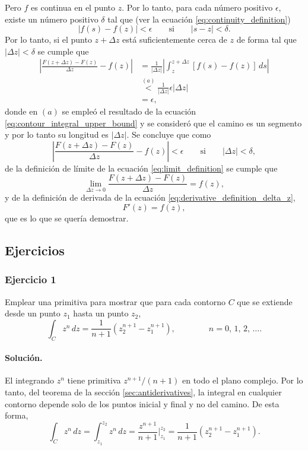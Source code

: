\documentclass[a4paper]{report}
\begin{document}
Pero \(f\) es continua en el punto \(z\). Por lo tanto, para cada número positivo \(\epsilon\), existe un número positivo \(\delta\) tal que (ver la ecuación \ref{eq:continuity_definition})
\[
 |f(s)-f(z)|<\epsilon\qquad\textrm{si}\qquad|s-z|<\delta. 
\]
Por lo tanto, si el punto \(z+\Delta z\) está suficientemente cerca de \(z\) de forma tal que \(|\Delta z|<\delta\) se cumple que
\begin{align*}
 \left|\frac{F(z+\Delta z)-F(z)}{\Delta z}-f(z)\right|&=\frac{1}{|\Delta z|}\left|\int_{z}^{z+\Delta z}[f(s)-f(z)]\,ds\right|\\ 
 &\overset{(a)}{<}\frac{1}{|\Delta z|}\epsilon|\Delta z|\\
 &=\epsilon,
\end{align*}
donde en \((a)\) se empleó el resultado de la ecuación \ref{eq:contour_integral_upper_bound} y se consideró que el camino es un segmento y por lo tanto su longitud es \(|\Delta z|\). Se concluye que como 
\[
 \left|\frac{F(z+\Delta z)-F(z)}{\Delta z}-f(z)\right|<\epsilon
 \qquad\textrm{si}\qquad|\Delta z|<\delta,
\]
de la definición de límite de la ecuación \ref{eq:limit_definition} se cumple que 
\[
 \lim_{\Delta z\to0}\frac{F(z+\Delta z)-F(z)}{\Delta z}=f(z),
\]
y de la definición de derivada de la ecuación \ref{eq:derivative_definition_delta_z},
\[
 F'(z)=f(z),
\]
que es lo que se quería demostrar.

\subsection*{Ejercicios}

\subsubsection*{Ejercicio 1}

Emplear una primitiva para mostrar que para cada contorno \(C\) que se extiende desde un punto \(z_1\) hasta un punto \(z_2\),
\[
 \int_Cz^n\,dz=\frac{1}{n+1}\left(z_2^{n+1}-z_1^{n+1}\right),
 \qquad\qquad
 n=0,\,1,\,2,\,\dots.
\]

\paragraph{Solución.} El integrando \(z^n\) tiene primitiva \(z^{n+1}/(n+1)\) en todo el plano complejo. Por lo tanto, del teorema de la sección \ref{sec:antiderivatives}, la integral en cualquier contorno depende solo de los puntos inicial y final y no del camino. De esta forma,
\[
 \int_Cz^n\,dz=\int_{z_1}^{z_2}z^n\,dz=\frac{z^{n+1}}{n+1}\bigg|_{z_1}^{z_2}=\frac{1}{n+1}\left(z_2^{n+1}-z_1^{n+1}\right).
\]
\end{document}
